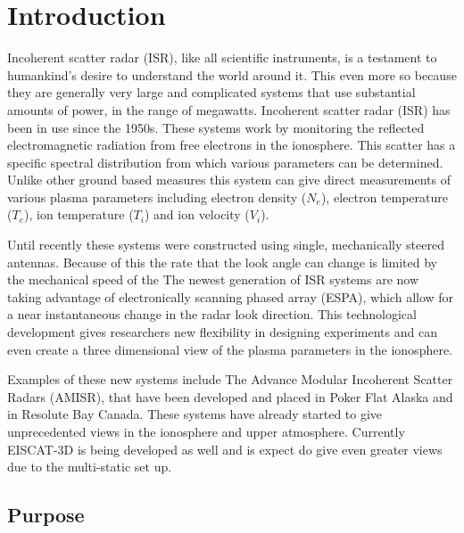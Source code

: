 \chapter{Introduction}
\label{chapter:body}
\thispagestyle{myheadings}
\setcounter{tocdepth}{1}
\graphicspath{{1_Intro/Figures/}}

Incoherent scatter radar (ISR), like all scientific instruments, is a testament to humankind's desire to understand the world around it. This even more so because they are generally very large and complicated systems that use substantial amounts of power, in the range of megawatts.
Incoherent scatter radar (ISR) has been in use since the 1950s\cite{gordon58}. These systems work by monitoring the reflected electromagnetic radiation from free electrons in the ionosphere. This scatter has a specific spectral distribution from which various parameters can be determined. Unlike other ground based measures this system can give direct measurements of various plasma parameters including electron density ($N_e$), electron temperature ($T_e$), ion temperature ($T_i$) and ion velocity ($V_i$). 

Until recently these systems were constructed using single, mechanically steered antennas. Because of this the rate that the look angle can change is limited by the mechanical speed of the  The newest generation of ISR systems are now taking advantage of electronically scanning phased array (ESPA), which allow for a near instantaneous change in the radar look direction. This technological development gives researchers new flexibility in designing experiments and can even create a three dimensional view of the plasma parameters in the ionosphere. 

Examples of these new systems include The Advance Modular Incoherent Scatter Radars (AMISR), that have been developed and placed in Poker Flat Alaska and in Resolute Bay Canada. These systems have already started to give unprecedented views in the ionosphere and upper atmosphere. Currently EISCAT-3D is being developed as well and is expect do give even greater views due to the multi-static set up.

\section{Purpose}

